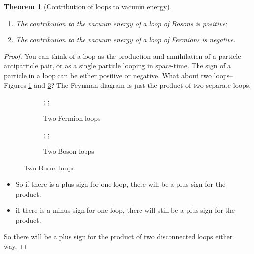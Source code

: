 \documentclass[]{article}
\newtheorem{thm}{Theorem}
\begin{document}
\begin{thm}[Contribution of loops to vacuum energy]\label{thm:contribution:loops}
	\hfill
	\begin{enumerate}
		\item The contribution to the vacuum energy of a loop of Bosons is positive;
		\item The contribution to the vacuum energy of a loop of Fermions is negative.
	\end{enumerate}
\end{thm}

\begin{proof}
	You can think of a loop as the production and annihilation of a particle-antiparticle pair, or as a single particle looping in space-time. The sign of a particle in a loop can be either positive or negative. What about two loops--Figures \ref{fig:two:loops:fermion} and \ref{fig:two:loops:boson}? The Feynman diagram is just the product of two separate loops.
	
	\begin{figure}[H]
		\caption{Two loops: each is a product of two separate loops.}\label{fig:two:loops}
		\begin{subfigure}[t]{0.45\textwidth}
			\begin{center}
				\caption{Two Fermion loops}\label{fig:two:loops:fermion}
				;
				;
			\end{center}
		\end{subfigure}
		\hfill
		\begin{subfigure}[t]{0.45\textwidth}
			\begin{center}
				\caption{Two Boson loops}\label{fig:two:loops:boson}
				;
				;
			\end{center}
		\end{subfigure}
	\end{figure}

	\begin{itemize}
		\item So if there is a plus sign for one loop, there will be a plus sign for the product.
		\item iI there is a minus sign for one loop, there will still be a plus sign for the product.
	\end{itemize} 
	So there will  be a plus sign for the product of two disconnected loops either way.
	

\end{proof}
\end{document}
